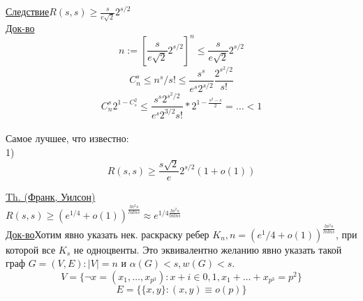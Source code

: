 \documentclass{article}
\begin{document}
\underline{Следствие}$R(s,s) \ge \frac{s}{e\sqrt{2}}2^{s/2}$\\
\underline{Док-во}\\
$$n:=[\frac{s}{e\sqrt{2}}2^{s/2}]^n \le \frac{s}{e\sqrt{2}}2^{s/2}$$
$$C_n^s \le n^s/s! \le \frac{s^s}{e^s2^{s/2}}\frac{2^{s^2/2}}{s!}$$
$$C_n^s2^{1-C_s^2} \le \frac{s^s2^{s^2/2}}{e^s2^{3/2}s!}*2^{1-\frac{s^2-s}{2}}=\ldots <1$$
\\

Самое лучшее, что известно:\\
1)$$ R(s,s) \ge \frac{s\sqrt 2}{e}2^{s/2}(1 + o(1))$$

\underline{Th. (Франк, Уилсон)}\\$R(s,s) \ge(e^{1/4} + o(1))^{\frac{ln^2s}{ln ln s}} \approx e^{1/4\frac{ln^2 s}{ln ln s}}$\\
\underline{Док-во}Хотим явно указать нек. раскраску ребер $K_n, n=(e^1/4 + o(1))^\frac{ln^2 s}{ln ln s}$, при которой
все $K_s$ не одноцвенты. Это эквивалентно желанию явно указать такой граф $G=(V,E):|V|=n$ и $\alpha(G) < s, w(G) < s$.
$$V=\{\neg x = (x_1,\ldots,x_{p^3}): x+i \in {0,1}, x_1 + \ldots + x_{p^3} = p^2\}$$
$$E = \{ \{x,y\}: (x,y) \equiv o(p)\}$$
\end{document}
